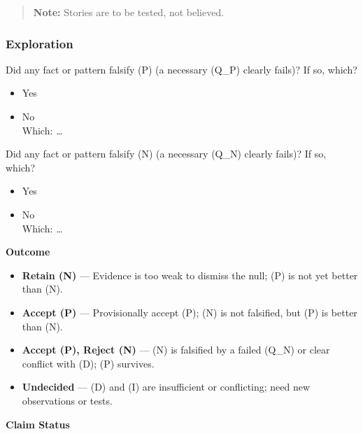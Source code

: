 \documentclass[
  letterpaper,
  DIV=11,
  numbers=noendperiod]{scrartcl}
\providecommand{\tightlist}{%
  \setlength{\itemsep}{0pt}\setlength{\parskip}{0pt}}
\begin{document}
\begin{quote}
\textbf{Note:} Stories are to be tested, not believed.
\end{quote}

\subsubsection{Exploration}\label{exploration}

Did any fact or pattern falsify (P) (a necessary (Q\_P) clearly fails)?
If so, which?

\begin{itemize}
\tightlist
\item[$\square$]
  Yes
\item[$\square$]
  No\\
  Which: \emph{\ldots{}}
\end{itemize}

Did any fact or pattern falsify (N) (a necessary (Q\_N) clearly fails)?
If so, which?

\begin{itemize}
\tightlist
\item[$\square$]
  Yes
\item[$\square$]
  No\\
  Which: \emph{\ldots{}}
\end{itemize}

\textbf{Outcome}

\begin{itemize}
\tightlist
\item[$\square$]
  \textbf{Retain (N)} --- Evidence is too weak to dismiss the null; (P)
  is not yet better than (N).
\item[$\square$]
  \textbf{Accept (P)} --- Provisionally accept (P); (N) is not
  falsified, but (P) is better than (N).
\item[$\square$]
  \textbf{Accept (P), Reject (N)} --- (N) is falsified by a failed
  (Q\_N) or clear conflict with (D); (P) survives.
\item[$\square$]
  \textbf{Undecided} --- (D) and (I) are insufficient or conflicting;
  need new observations or tests.
\end{itemize}

\textbf{Claim Status}
\end{document}
